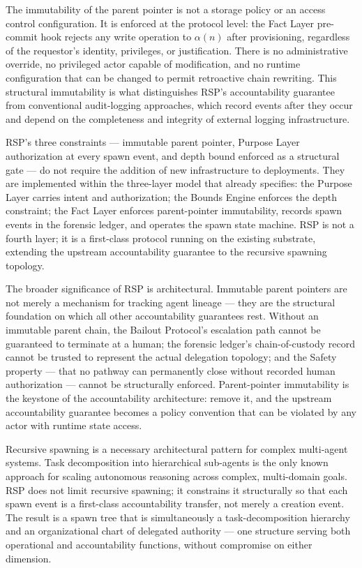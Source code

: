 The immutability of the parent pointer is not a storage policy or an access control configuration. It is enforced at the protocol level: the Fact Layer pre-commit hook rejects any write operation to $\alpha(n)$ after provisioning, regardless of the requestor's identity, privileges, or justification. There is no administrative override, no privileged actor capable of modification, and no runtime configuration that can be changed to permit retroactive chain rewriting. This structural immutability is what distinguishes RSP's accountability guarantee from conventional audit-logging approaches, which record events after they occur and depend on the completeness and integrity of external logging infrastructure.

RSP's three constraints — immutable parent pointer, Purpose Layer authorization at every spawn event, and depth bound enforced as a structural gate — do not require the addition of new infrastructure to \bxthree{} deployments. They are implemented within the three-layer model that \bxthree{} already specifies: the Purpose Layer carries intent and authorization; the Bounds Engine enforces the depth constraint; the Fact Layer enforces parent-pointer immutability, records spawn events in the forensic ledger, and operates the spawn state machine. RSP is not a fourth layer; it is a first-class protocol running on the existing substrate, extending the upstream accountability guarantee to the recursive spawning topology.

The broader significance of RSP is architectural. Immutable parent pointers are not merely a mechanism for tracking agent lineage — they are the structural foundation on which all other accountability guarantees rest. Without an immutable parent chain, the Bailout Protocol's escalation path cannot be guaranteed to terminate at a human; the forensic ledger's chain-of-custody record cannot be trusted to represent the actual delegation topology; and the Safety property — that no pathway can permanently close without recorded human authorization — cannot be structurally enforced. Parent-pointer immutability is the keystone of the \bxthree{} accountability architecture: remove it, and the upstream accountability guarantee becomes a policy convention that can be violated by any actor with runtime state access.

Recursive spawning is a necessary architectural pattern for complex multi-agent systems. Task decomposition into hierarchical sub-agents is the only known approach for scaling autonomous reasoning across complex, multi-domain goals. RSP does not limit recursive spawning; it constrains it structurally so that each spawn event is a first-class accountability transfer, not merely a creation event. The result is a spawn tree that is simultaneously a task-decomposition hierarchy and an organizational chart of delegated authority — one structure serving both operational and accountability functions, without compromise on either dimension.